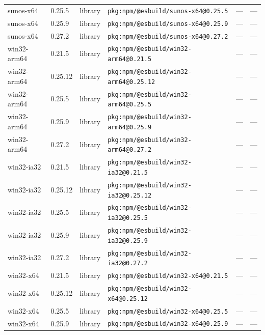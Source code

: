 \documentclass[11pt,a4paper]{article}
\begin{document}
\begin{longtable}{|p{4cm}|p{2cm}|p{1.6cm}|p{5cm}|p{1.5cm}|p{3.5cm}|}
\raggedright sunos-x64 & 0.25.5 & library & \small\texttt{pkg:npm/@esbuild/sunos-x64@0.25.5} & — & \small — \\
\raggedright sunos-x64 & 0.25.9 & library & \small\texttt{pkg:npm/@esbuild/sunos-x64@0.25.9} & — & \small — \\
\raggedright sunos-x64 & 0.27.2 & library & \small\texttt{pkg:npm/@esbuild/sunos-x64@0.27.2} & — & \small — \\
\raggedright win32-arm64 & 0.21.5 & library & \small\texttt{pkg:npm/@esbuild/win32-arm64@0.21.5} & — & \small — \\
\raggedright win32-arm64 & 0.25.12 & library & \small\texttt{pkg:npm/@esbuild/win32-arm64@0.25.12} & — & \small — \\
\raggedright win32-arm64 & 0.25.5 & library & \small\texttt{pkg:npm/@esbuild/win32-arm64@0.25.5} & — & \small — \\
\raggedright win32-arm64 & 0.25.9 & library & \small\texttt{pkg:npm/@esbuild/win32-arm64@0.25.9} & — & \small — \\
\raggedright win32-arm64 & 0.27.2 & library & \small\texttt{pkg:npm/@esbuild/win32-arm64@0.27.2} & — & \small — \\
\raggedright win32-ia32 & 0.21.5 & library & \small\texttt{pkg:npm/@esbuild/win32-ia32@0.21.5} & — & \small — \\
\raggedright win32-ia32 & 0.25.12 & library & \small\texttt{pkg:npm/@esbuild/win32-ia32@0.25.12} & — & \small — \\
\raggedright win32-ia32 & 0.25.5 & library & \small\texttt{pkg:npm/@esbuild/win32-ia32@0.25.5} & — & \small — \\
\raggedright win32-ia32 & 0.25.9 & library & \small\texttt{pkg:npm/@esbuild/win32-ia32@0.25.9} & — & \small — \\
\raggedright win32-ia32 & 0.27.2 & library & \small\texttt{pkg:npm/@esbuild/win32-ia32@0.27.2} & — & \small — \\
\raggedright win32-x64 & 0.21.5 & library & \small\texttt{pkg:npm/@esbuild/win32-x64@0.21.5} & — & \small — \\
\raggedright win32-x64 & 0.25.12 & library & \small\texttt{pkg:npm/@esbuild/win32-x64@0.25.12} & — & \small — \\
\raggedright win32-x64 & 0.25.5 & library & \small\texttt{pkg:npm/@esbuild/win32-x64@0.25.5} & — & \small — \\
\raggedright win32-x64 & 0.25.9 & library & \small\texttt{pkg:npm/@esbuild/win32-x64@0.25.9} & — & \small — \\

\end{longtable}
\end{document}
